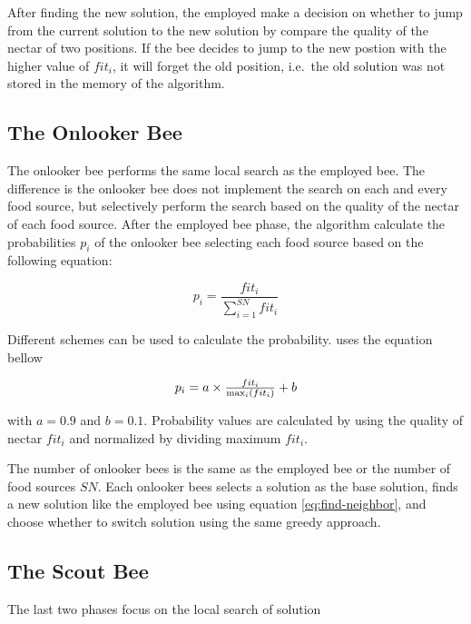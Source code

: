 \documentclass[]{article}
\begin{document}
After finding the new solution, the employed make a decision on whether to jump from the current solution to the new solution by compare the quality of the nectar of two positions. If the bee decides to jump to the new postion with the higher value of \(fit_i\), it will forget the old position, i.e.~the old solution was not stored in the memory of the algorithm.

\hypertarget{the-onlooker-bee}{%
\subsection{The Onlooker Bee}\label{the-onlooker-bee}}

The onlooker bee performs the same local search as the employed bee. The difference is the onlooker bee does not implement the search on each and every food source, but selectively perform the search based on the quality of the nectar of each food source. After the employed bee phase, the algorithm calculate the probabilities \(p_i\) of the onlooker bee selecting each food source based on the following equation:

\begin{equation}
\label{eq:prob}
p_i = \frac{fit_i}{\sum^{SN}_{i=1} fit_i}
\end{equation}

Different schemes can be used to calculate the probability. \textcite{ABCoptim} uses the equation bellow

\begin{equation}
\label{eq:prob2}
 $$p_i=a\times\frac{fit_i}{\max_i(fit_i)}+b$$
\end{equation}

with \(a=0.9\) and \(b=0.1\). Probability values are calculated by using the quality of nectar \(fit_i\) and normalized by dividing maximum \(fit_i\).

The number of onlooker bees is the same as the employed bee or the number of food sources \(SN\). Each onlooker bees selects a solution as the base solution, finds a new solution like the employed bee using equation \eqref{eq:find-neighbor}, and choose whether to switch solution using the same greedy approach.

\hypertarget{the-scout-bee}{%
\subsection{The Scout Bee}\label{the-scout-bee}}

The last two phases focus on the local search of solution
\end{document}
